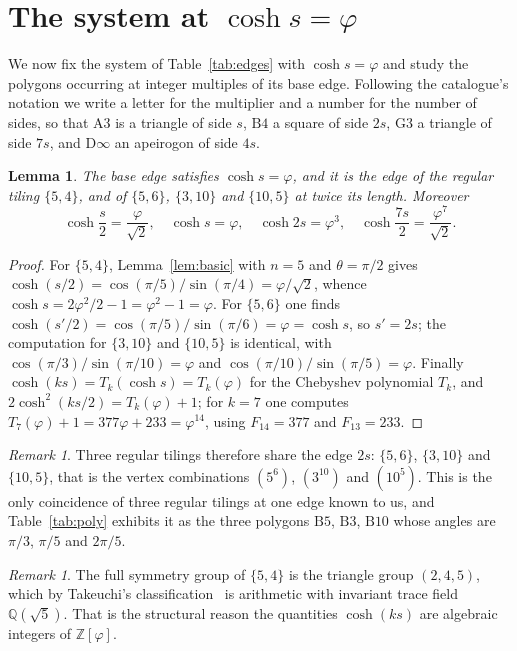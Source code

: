 \documentclass[11pt,a4paper]{article}
\theoremstyle{plain}
\newtheorem{lemma}[theorem]{Lemma}
\theoremstyle{definition}
\theoremstyle{remark}
\newtheorem{remark}[theorem]{Remark}
\newcommand{\ZZ}{\mathbb{Z}}
\newcommand{\QQ}{\mathbb{Q}}
\newcommand{\vc}[1]{(#1)}
\begin{document}
\section{The system at \texorpdfstring{$\cosh s=\varphi$}{cosh s = phi}}\label{sec:lattice}

We now fix the system of Table~\ref{tab:edges} with $\cosh s=\varphi$ and study
the polygons occurring at integer multiples of its base edge. Following the
catalogue's notation we write a letter for the multiplier and a number for the
number of sides, so that $\mathrm{A}3$ is a triangle of side $s$, $\mathrm{B}4$ a
square of side $2s$, $\mathrm{G}3$ a triangle of side $7s$, and
$\mathrm{D}\infty$ an apeirogon of side $4s$.

\begin{lemma}\label{lem:base}
The base edge satisfies $\cosh s=\varphi$, and it is the edge of the regular
tiling $\{5,4\}$, and of $\{5,6\}$, $\{3,10\}$ and $\{10,5\}$ at twice its
length. Moreover
\[
  \cosh\frac{s}{2}=\frac{\varphi}{\sqrt2},\quad
  \cosh s=\varphi,\quad
  \cosh 2s=\varphi^{3},\quad
  \cosh\frac{7s}{2}=\frac{\varphi^{7}}{\sqrt2}.
\]
\end{lemma}

\begin{proof}
For $\{5,4\}$, Lemma~\ref{lem:basic} with $n=5$ and $\theta=\pi/2$ gives
$\cosh(s/2)=\cos(\pi/5)/\sin(\pi/4)=\varphi/\sqrt2$, whence
$\cosh s=2\varphi^{2}/2-1=\varphi^{2}-1=\varphi$. For $\{5,6\}$ one finds
$\cosh(s'/2)=\cos(\pi/5)/\sin(\pi/6)=\varphi=\cosh s$, so $s'=2s$; the
computation for $\{3,10\}$ and $\{10,5\}$ is identical, with
$\cos(\pi/3)/\sin(\pi/10)=\varphi$ and $\cos(\pi/10)/\sin(\pi/5)=\varphi$.
Finally $\cosh(ks)=T_k(\cosh s)=T_k(\varphi)$ for the Chebyshev polynomial
$T_k$, and $2\cosh^{2}(ks/2)=T_k(\varphi)+1$; for $k=7$ one computes
$T_7(\varphi)+1=377\varphi+233=\varphi^{14}$, using $F_{14}=377$ and $F_{13}=233$.
\end{proof}

\begin{remark}
Three regular tilings therefore share the edge $2s$: $\{5,6\}$, $\{3,10\}$ and
$\{10,5\}$, that is the vertex combinations $\vc{5^{6}}$, $\vc{3^{10}}$ and
$\vc{10^{5}}$. This is the only coincidence of three regular tilings at one edge
known to us, and Table~\ref{tab:poly} exhibits it as the three polygons
$\mathrm{B}5$, $\mathrm{B}3$, $\mathrm{B}10$ whose angles are $\pi/3$, $\pi/5$
and $2\pi/5$.
\end{remark}

\begin{remark}
The full symmetry group of $\{5,4\}$ is the triangle group $(2,4,5)$, which by
Takeuchi's classification~\cite{takeuchi} is arithmetic with invariant trace
field $\QQ(\sqrt5)$. That is the structural reason the quantities $\cosh(ks)$
are algebraic integers of $\ZZ[\varphi]$.
\end{remark}
\end{document}
